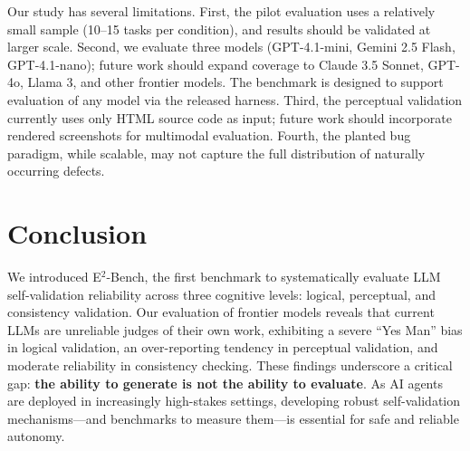 \documentclass[11pt]{fairmeta}
\begin{document}
Our study has several limitations. First, the pilot evaluation uses a relatively small sample (10--15 tasks per condition), and results should be validated at larger scale. Second, we evaluate three models (GPT-4.1-mini, Gemini 2.5 Flash, GPT-4.1-nano); future work should expand coverage to Claude 3.5 Sonnet, GPT-4o, Llama 3, and other frontier models. The benchmark is designed to support evaluation of any model via the released harness. Third, the perceptual validation currently uses only HTML source code as input; future work should incorporate rendered screenshots for multimodal evaluation. Fourth, the planted bug paradigm, while scalable, may not capture the full distribution of naturally occurring defects.

\section{Conclusion}

We introduced E$^2$-Bench, the first benchmark to systematically evaluate LLM self-validation reliability across three cognitive levels: logical, perceptual, and consistency validation. Our evaluation of frontier models reveals that current LLMs are unreliable judges of their own work, exhibiting a severe ``Yes Man'' bias in logical validation, an over-reporting tendency in perceptual validation, and moderate reliability in consistency checking. These findings underscore a critical gap: \textbf{the ability to generate is not the ability to evaluate}. As AI agents are deployed in increasingly high-stakes settings, developing robust self-validation mechanisms---and benchmarks to measure them---is essential for safe and reliable autonomy.



\end{document}
